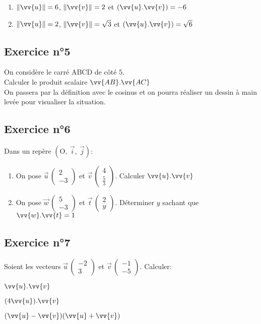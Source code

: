 \documentclass[12pt,a4paper]{article}
\def\Oij{$\left(\text{O},~\vec{i},~\vec{j}\right)$}
\newcommand*{\Coord}[3]{%
  \ensuremath{\overrightarrow{#1}\, 
    \begin{pmatrix} 
      #2\\ 
      #3 
    \end{pmatrix}}}
\begin{document}
\begin{enumerate}
    \item $\norme{\vv{u}}=6$, $\norme{\vv{v}}=2$ et $(\vv{u}.\vv{v})=-6 $
    \item $\norme{\vv{u}}=2$, $\norme{\vv{v}}=\sqrt{3}$ et $(\vv{u}.\vv{v})=\sqrt{6} $
\end{enumerate}

\subsection*{Exercice n°5}

On considère le carré ABCD de côté $5$.\\ Calculer le produit scalaire $\vv{AB}.\vv{AC}$\\
On passera par la définition avec le cosinus et on pourra réaliser un dessin à main levée pour visualiser la situation.

\subsection*{Exercice n°6}

Dans un repère \Oij{}:

\begin{enumerate}
    \item On pose $\Coord{u}{2}{-3}$ et $\Coord{v}{4}{\frac{5}{3}}$. Calculer $\vv{u}.\vv{v}$ 
    \item On pose $\Coord{w}{5}{-3}$ et $\Coord{t}{2}{y}$. Déterminer $y$ sachant que $\vv{w}.\vv{t}=1$ 
\end{enumerate}

\subsection*{Exercice n°7}

Soient les vecteurs $\Coord{u}{-2}{3}$ et 
$\Coord{v}{-1}{-5}$. Calculer:

\begin{enumerate}
\begin{minipage}[t]{0.4\linewidth}
\item $\vv{u}.\vv{v}$

\end{minipage}
\begin{minipage}[t]{0.4\linewidth}
\item $(4\vv{u}).\vv{v}$

\end{minipage}
\begin{minipage}[t]{0.4\linewidth}
\item $(\vv{u}-\vv{v})(\vv{u}+\vv{v})$
\end{minipage}
\end{enumerate}
\end{document}
